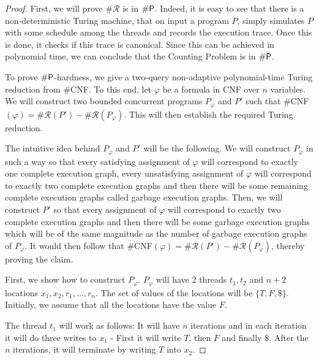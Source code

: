 \begin{proof}
    First, we will prove $\#\mathcal{R}$ is in $\#\mathsf{P}$. Indeed, it is easy to see that there is a non-deterministic Turing machine, that on input a program $P$, simply simulates $P$ with some schedule among the threads and records the execution trace. 
    Once this is done, it checks if this trace is canonical. 
    Since this can be achieved in polynomial time, we can conclude
    that the Counting Problem is in $\#\mathsf{P}$.

    To prove $\#\mathsf{P}$-hardness, we give a two-query non-adaptive
polynomial-time Turing reduction from $\#$CNF.
    To this end, let $\varphi$ be a formula in CNF over $n$ variables. We will construct
    two bounded concurrent programs $P_\varphi$ and $P'$ such that $\#$CNF$(\varphi) = \#\mathcal{R}(P') - \#\mathcal{R}(P_\varphi)$. This will then establish the required
    Turing reduction.

    The intuitive idea behind $P_\varphi$ and $P'$ will be the following.
    We will construct $P_\varphi$ in such a way so that  every satisfying
    assignment of $\varphi$ will correspond to exactly one complete execution graph,
    every unsatisfying assignment of $\varphi$ will correspond to exactly two
    complete execution graphs and then there will be some remaining complete execution
    graphs called garbage execution graphs. Then, we will construct $P'$ so that
    every assignment of $\varphi$ will correspond to exactly two complete execution graphs
    and then there will be some garbage execution graphs which will be of the same magnitude as the number of garbage execution graphs of $P_\varphi$. It would then follow that $\#$CNF$(\varphi) = \#\mathcal{R}(P') - \#\mathcal{R}(P_\varphi)$,
    thereby proving the claim.

    First, we show how to construct $P_\varphi$. $P_\varphi$ will have 2 threads $t_1, t_2$
    and $n+2$ locations $x_1,x_2,r_1,\dots,r_n$. The set of values of the locations will be $\{T,F,\$\}$. Initially, we assume that all the locations have the value $F$.

    The thread $t_1$ will work as follows: It will have $n$ iterations
    and in each iteration it will do three writes to $x_1$ - First it
    will write $T$, then $F$ and finally $\$$.
    After the $n$ iterations, it will terminate by writing $T$ into $x_2$. 
    

\end{proof}
